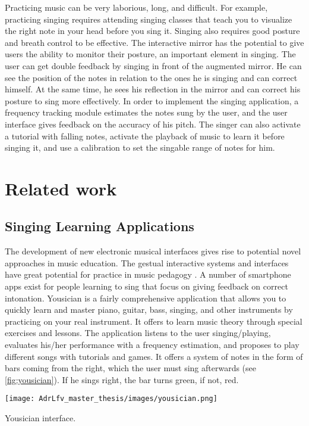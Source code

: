 Practicing music can be very laborious, long, and difficult. For example, practicing singing requires attending singing classes that teach you to visualize the right note in your head before you sing it. Singing also requires good posture and breath control to be effective.
The interactive mirror has the potential to give users the ability to monitor their posture, an important element in singing. The user can get double feedback by singing in front of the augmented mirror. He can see the position of the notes in relation to the ones he is singing and can correct himself.
At the same time, he sees his reflection in the mirror and can correct his posture to sing more effectively. In order to implement the singing application, a frequency tracking module estimates the notes sung by the user, and the user interface gives feedback on the accuracy of his pitch.
The singer can also activate a tutorial with falling notes, activate the playback of music to learn it before singing it, and use a calibration to set the singable range of notes for him.

\section{Related work}

\subsection{Singing Learning Applications}

The development of new electronic musical interfaces gives rise to potential novel approaches in music education. The gestual interactive systems and interfaces have great potential for practice in music pedagogy \cite{farrugia2015tunes}.
A number of smartphone apps exist for people learning to sing that focus on giving feedback on correct intonation.
Yousician is a fairly comprehensive application that allows you to quickly learn and master piano, guitar, bass, singing, and other instruments by practicing on your real instrument.
It offers to learn music theory through special exercises and lessons. The application listens to the user singing/playing, evaluates his/her performance with a frequency estimation, and proposes to play different songs with tutorials and games. It offers a system of notes in the form of bars coming from the right, which the user must sing afterwards (see \ref{fig:yousician}). If he sings right, the bar turns green, if not, red.

\begin{marginfigure}
    \centering
    \texttt{[image: AdrLfv\_master\_thesis/images/yousician.png]}
    \caption{Yousician interface.}
    \label{fig:yousician}
\end{marginfigure}

